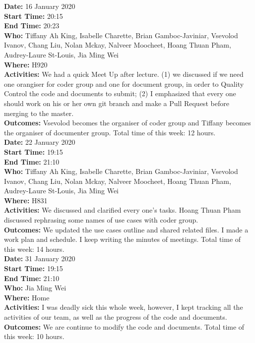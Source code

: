 \documentclass[12pt]{article}
\begin{document}
{\bf Date:} 16 January 2020\\
{\bf Start Time:} 20:15\\
{\bf End Time:}  20:23\\
{\bf Who:} Tiffany Ah King,
Isabelle Charette,
Brian Gamboc-Javiniar,
Vsevolod Ivanov,
Chang Liu,
Nolan Mckay,
Nalveer Moocheet,
Hoang Thuan Pham,
Audrey-Laure St-Louis,
Jia Ming Wei\\
{\bf Where:} H920 \\
{\bf Activities:} We had a quick Meet Up after lecture. (1) we discussed if we need one orangiser for coder group and one for document group, in order to Quality Control the code and documents to submit; (2) I emphasized that every one should work on his or her own git branch and make a Pull Request before merging to the master.\\
{\bf Outcomes:} Vsevolod becomes the organiser of coder group and Tiffany becomes the organiser of documenter group. Total time of this week: 12 hours.\\

{\bf Date:} 22 January 2020\\
{\bf Start Time:} 19:15\\
{\bf End Time:}  21:10\\
{\bf Who:} Tiffany Ah King,
Isabelle Charette,
Brian Gamboc-Javiniar,
Vsevolod Ivanov,
Chang Liu,
Nolan Mckay,
Nalveer Moocheet,
Hoang Thuan Pham,
Audrey-Laure St-Louis,
Jia Ming Wei\\
{\bf Where:} H831 \\
{\bf Activities:}  We discussed and clarified every one's tasks. Hoang Thuan Pham discussed rephrasing some names of use cases with coder group.  \\
{\bf Outcomes:} We updated the use cases outline and shared related files. I made a work plan and schedule. I keep writing the minutes of meetings. Total time of this week: 14 hours.\\

{\bf Date:} 31 January 2020\\
{\bf Start Time:} 19:15\\
{\bf End Time:}  21:10\\
{\bf Who:} 
Jia Ming Wei\\
{\bf Where:} Home\\
{\bf Activities:}  I was deadly sick this whole week, however, I kept tracking all the activities of our team, as well as the progress of the code and documents.  \\
{\bf Outcomes:} We are continue to modify the code and documents. Total time of this week: 10 hours.\\
\end{document}
